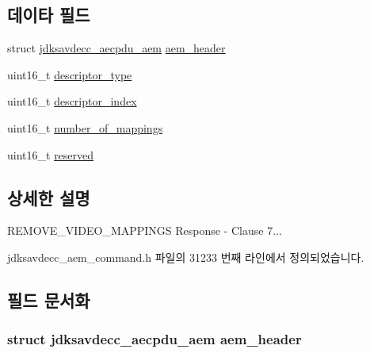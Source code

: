 \subsection*{데이타 필드}
\begin{DoxyCompactItemize}
\item 
struct \hyperlink{structjdksavdecc__aecpdu__aem}{jdksavdecc\+\_\+aecpdu\+\_\+aem} \hyperlink{structjdksavdecc__aem__command__remove__video__mappings__response_ae1e77ccb75ff5021ad923221eab38294}{aem\+\_\+header}
\item 
uint16\+\_\+t \hyperlink{structjdksavdecc__aem__command__remove__video__mappings__response_ab7c32b6c7131c13d4ea3b7ee2f09b78d}{descriptor\+\_\+type}
\item 
uint16\+\_\+t \hyperlink{structjdksavdecc__aem__command__remove__video__mappings__response_a042bbc76d835b82d27c1932431ee38d4}{descriptor\+\_\+index}
\item 
uint16\+\_\+t \hyperlink{structjdksavdecc__aem__command__remove__video__mappings__response_ac7db472c5622ef473d5d0a5c416d5531}{number\+\_\+of\+\_\+mappings}
\item 
uint16\+\_\+t \hyperlink{structjdksavdecc__aem__command__remove__video__mappings__response_a5a6ed8c04a3db86066924b1a1bf4dad3}{reserved}
\end{DoxyCompactItemize}


\subsection{상세한 설명}
R\+E\+M\+O\+V\+E\+\_\+\+V\+I\+D\+E\+O\+\_\+\+M\+A\+P\+P\+I\+N\+GS Response -\/ Clause 7... 

jdksavdecc\+\_\+aem\+\_\+command.\+h 파일의 31233 번째 라인에서 정의되었습니다.



\subsection{필드 문서화}
\subsubsection[{\texorpdfstring{aem\+\_\+header}{aem_header}}]{\setlength{\rightskip}{0pt plus 5cm}struct {\bf jdksavdecc\+\_\+aecpdu\+\_\+aem} aem\+\_\+header}\hypertarget{structjdksavdecc__aem__command__remove__video__mappings__response_ae1e77ccb75ff5021ad923221eab38294}{}\label{structjdksavdecc__aem__command__remove__video__mappings__response_ae1e77ccb75ff5021ad923221eab38294}


